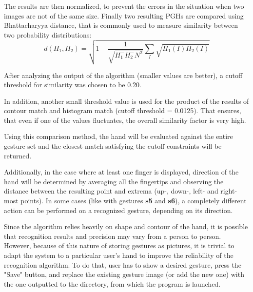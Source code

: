 \documentclass[a4paper,11pt,oneside]{article}
\begin{document}
\begin{itemize}
The results are then normalized, to prevent the errors in the situation when two images are not of the same size. Finally two resulting PGHs are compared using Bhattacharyya distance, that is commonly used to measure similarity between two probability distributions:
\[ d(H_1, H_2) = \sqrt{1- \frac{1}{ \sqrt{H_1^{-} H_2^{-} N^2}}  \sum\limits_{I} \sqrt{H_1(I) H_2(I)}} \] 

After analyzing the output of the algorithm (smaller values are better), a cutoff threshold for similarity was chosen to be 0.20.\\

\end{itemize}

In addition, another small threshold value is used for the product of the results of contour match and histogram match (cutoff threshold = 0.0125). That ensures, that even if one of the values fluctuates, the overall similarity factor is very high.

Using this comparison method, the hand will be evaluated against the entire gesture set and the closest match satisfying the cutoff constraints will be returned.

Additionally, in the case where at least one finger is displayed, direction of the hand will be determined by averaging all the fingertips and observing the distance between the resulting point and extrema (up-, down-, left- and right-most points). In some cases (like with gestures \textbf{s5} and \textbf{s6}), a completely different action can be performed on a recognized gesture, depending on its direction.

Since the algorithm relies heavily on shape and contour of the hand, it is possible that recognition results and precision may vary from a person to person. However, because of this nature of storing gestures as pictures, it is trivial to adapt the system to a particular user's hand to improve the reliability of the recognition algorithm. To do that, user has to show a desired gesture, press the "Save" button, and replace the existing gesture image (or add the new one) with the one outputted to the directory, from which the program is launched. 
\end{document}
